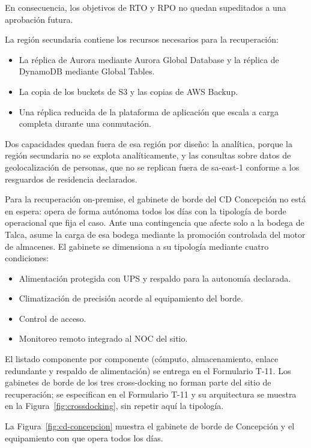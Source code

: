 En consecuencia, los objetivos de RTO y RPO no quedan supeditados a una aprobación futura.

La región secundaria contiene los recursos necesarios para la recuperación:

\begin{itemize}
  \item La réplica de Aurora mediante Aurora Global Database y la réplica de DynamoDB mediante Global Tables.
  \item La copia de los buckets de S3 y las copias de AWS Backup.
  \item Una réplica reducida de la plataforma de aplicación que escala a carga completa durante una conmutación.
\end{itemize}

Dos capacidades quedan fuera de esa región por diseño: la analítica, porque la región secundaria no se explota analíticamente, y las consultas sobre datos de geolocalización de personas, que no se replican fuera de sa-east-1 conforme a los resguardos de residencia declarados.

Para la recuperación on-premise, el gabinete de borde del CD Concepción no está en espera: opera de forma autónoma todos los días con la tipología de borde operacional que fija el caso. Ante una contingencia que afecte solo a la bodega de Talca, asume la carga de esa bodega mediante la promoción controlada del motor de almacenes. El gabinete se dimensiona a su tipología mediante cuatro condiciones:

\begin{itemize}
  \item Alimentación protegida con UPS y respaldo para la autonomía declarada.
  \item Climatización de precisión acorde al equipamiento del borde.
  \item Control de acceso.
  \item Monitoreo remoto integrado al NOC del sitio.
\end{itemize}

El listado componente por componente (cómputo, almacenamiento, enlace redundante y respaldo de alimentación) se entrega en el Formulario T-11. Los gabinetes de borde de los tres cross-docking no forman parte del sitio de recuperación; se especifican en el Formulario T-11 y su arquitectura se muestra en la Figura~\ref{fig:crossdocking}, sin repetir aquí la tipología.

La Figura~\ref{fig:cd-concepcion} muestra el gabinete de borde de Concepción y el equipamiento con que opera todos los días.

